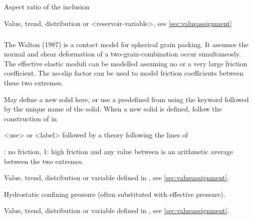{
 \slist
   \item \Description Aspect ratio of the inclusion
   \item \Argument Value, trend, distribution or <reservoir-variable>, see \autoref{sec:valueassignment}
   \item \Default
 \elist

\subparagraph{}
 \slist
   \item \Description The Walton (1987) is a contact model for spherical grain packing. It assumes the normal and shear deformation of a two-grain-combination occur simultaneosly. The effective elastic moduli can be modelled assuming no or a very large friction coefficient. The no-slip factor can be used to model friction coefficients between these two extremes.
   \item \Argument
   \item \Default
 \elist

 \slist
   \item \Description May define a new solid here, or use a predefined  from  using the keyword  followed by the unique name of the solid. When a new solid is defined, follow the construction of  in 
   \item \Argument <use> or <label> followed by a theory following the lines of 
   \item \Default
 \elist

 \slist
   \item {}: no friction, 1: high friction and any value between is an arithmetic average between the two extremes.
   \item \Argument Value, trend, distribution or variable defined in , see \autoref{sec:valueassignment}.
   \item \Default
 \elist

 \slist
   \item \Description Hydrostatic confining pressure (often substituted with effective pressure).
   \item \Argument Value, trend, distribution or variable defined in , see \autoref{sec:valueassignment}.
   \item \Default
 \elist

}
